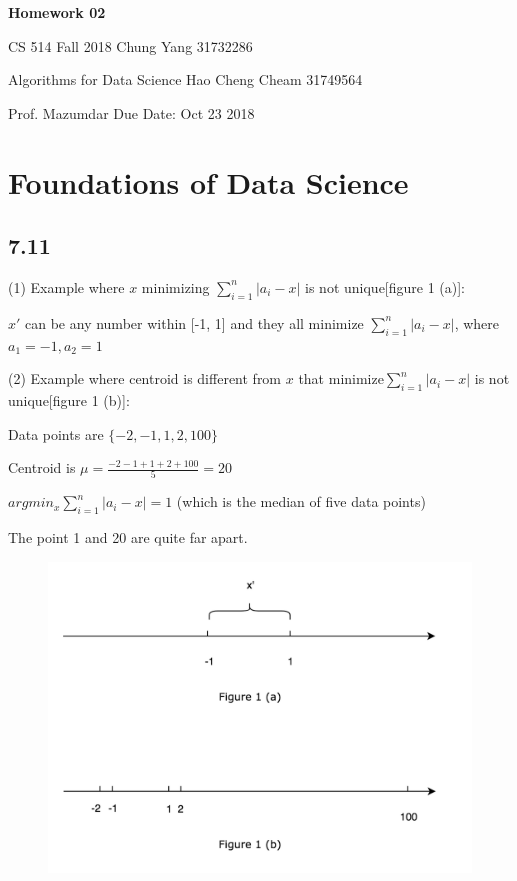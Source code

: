\documentclass[a4paper, 11pt]{article}
\begin{document}
\noindent \large\textbf{Homework 02}

\normalsize CS 514 Fall 2018 \hfill Chung Yang 31732286

Algorithms for Data Science \hfill Hao Cheng Cheam 31749564



Prof. Mazumdar \hfill Due Date: Oct 23 2018 \\

\section*{Foundations of Data Science}

\subsection*{7.11}

(1) Example where $x$ minimizing $\sum_{i=1}^n |a_i - x|$ is not unique[figure 1 (a)]:


$x'$ can be any number within [-1, 1] and they all minimize $\sum_{i=1}^n |a_i - x|$, where $a_1 = -1, a_2 = 1$

(2) Example where centroid is different from $x$ that minimize$\sum_{i=1}^n |a_i - x|$ is not unique[figure 1 (b)]:

Data points are $\{-2, -1, 1, 2, 100 \}$

Centroid is $\mu = \frac{-2-1+1+2+100}{5} = 20$

$argmin_x  \sum_{i=1}^n |a_i - x| = 1$ (which is the median of five data points)

The point 1 and 20 are quite far apart.


\begin{figure}[htbp]
	\centering
	\includegraphics[scale=0.45]{figure1.png}
\end{figure}
\end{document}
